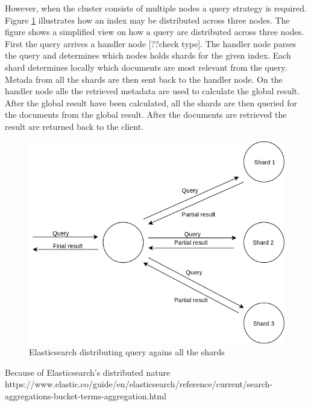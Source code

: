 However, when the cluster consists of multiple nodes a query strategy is required.
Figure \ref{fig:elasticsearch-sharding} illustrates how an index may be distributed across three nodes.
The figure shows a simplified view on how a query are distributed across three nodes.
First the query arrives a handler node [??check type].
The handler node parses the query and determines which nodes holds shards for the given index.
Each shard determines locally which documents are most relevant from the query.
Metada from all the shards are then sent back to the handler node.
On the handler node alle the retrieved metadata are used to calculate the global result.
After the global result have been calculated,
all the shards are then queried for the documents from the global result.
After the documents are retrieved the result are returned back to the client.

\begin{figure}[h!]
  \centering \includegraphics[width=0.9\linewidth]{img/elasticsearch-sharding.png}
  \caption{Elasticsearch distributing query agains all the shards}
  \label{fig:elasticsearch-sharding}
\end{figure}

Because of Elasticsearch's distributed nature
https://www.elastic.co/guide/en/elasticsearch/reference/current/search-aggregations-bucket-terms-aggregation.html
